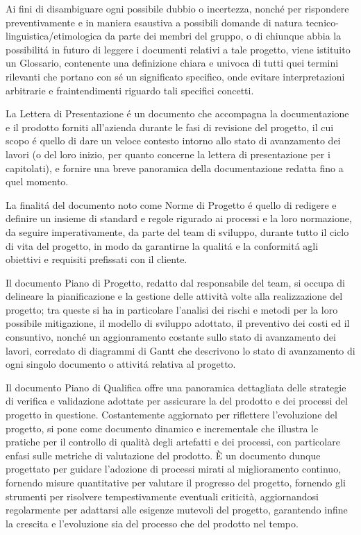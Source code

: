 Ai fini di disambiguare ogni possibile dubbio o incertezza, nonché per rispondere preventivamente e in maniera esaustiva a possibili domande di natura tecnico-linguistica/etimologica da parte dei membri del gruppo, o di chiunque abbia la possibilitá in futuro di leggere i documenti relativi a tale progetto, viene istituito un Glossario, contenente una definizione chiara e univoca di tutti quei termini rilevanti che portano con sé un significato specifico, onde evitare interpretazioni arbitrarie e fraintendimenti riguardo tali specifici concetti.

La Lettera di Presentazione é un documento che accompagna la documentazione e il prodotto forniti all'azienda  durante le fasi di revisione del progetto, il cui scopo é quello di dare un veloce contesto intorno allo stato di avanzamento dei lavori (o del loro inizio, per quanto concerne la lettera di presentazione per i capitolati), e fornire una breve panoramica della documentazione redatta fino a quel momento. 

La finalitá del documento noto come Norme di Progetto é quello di redigere e definire un insieme di standard e regole rigurado ai processi e la loro normazione, da seguire imperativamente, da parte del team di sviluppo, durante tutto il ciclo di vita del progetto, in modo da garantirne la qualitá e la conformitá agli obiettivi e requisiti prefissati con il cliente.

Il documento Piano di Progetto, redatto dal responsabile del team, si occupa di delineare la pianificazione e la gestione delle attività volte alla realizzazione del progetto; tra queste si ha in particolare l'analisi dei rischi e metodi per la loro possibile mitigazione, il modello di sviluppo adottato, il preventivo dei costi ed il consuntivo, nonché un aggionramento costante sullo stato di avanzamento dei lavori, corredato di diagrammi di Gantt che descrivono lo stato di avanzamento di ogni singolo documento o attivitá relativa al progetto.

Il documento Piano di Qualifica offre una panoramica dettagliata delle strategie di verifica e validazione adottate per assicurare la  del prodotto e dei processi del progetto in questione. Costantemente aggiornato per riflettere l'evoluzione del progetto, si pone come documento dinamico e incrementale che illustra le pratiche per il controllo di qualità degli artefatti e dei processi, con particolare enfasi sulle metriche di valutazione del prodotto. È un documento dunque progettato per guidare l'adozione di processi mirati al miglioramento continuo, fornendo misure quantitative per valutare il progresso del progetto, fornendo gli strumenti per risolvere tempestivamente eventuali criticità, aggiornandosi regolarmente per adattarsi alle esigenze mutevoli del progetto, garantendo infine la crescita e l'evoluzione sia del processo che del prodotto nel tempo.

